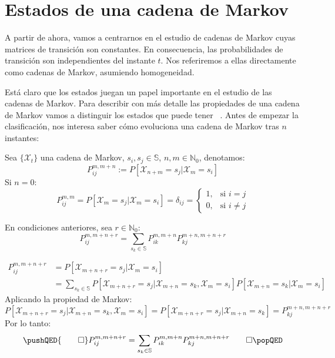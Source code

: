 \section{Estados de una cadena de Markov}
A partir de ahora, vamos a centrarnos en el estudio de cadenas de Markov cuyas matrices de transición son constantes. En consecuencia, las probabilidades de transición son independientes del instante $t$. Nos referiremos a ellas directamente como cadenas de Markov, asumiendo homogeneidad. 

Está claro que los estados juegan un papel importante en el estudio de las cadenas de Markov. Para describir con más detalle las propiedades de una cadena de Markov vamos a distinguir los estados que puede tener ~\cite{Barbosa}. Antes de empezar la clasificación, nos interesa saber cómo evoluciona una cadena de Markov tras $n$ instantes:


\begin{definition}
Sea $\{\mathcal{X}_t\}$ una cadena de Markov, $s_i, s_j \in \mathbb{S}$, $n,m\in\mathbb{N}_0$, denotamos:
\[P_{ij}^{m,m+n}:=P[\mathcal{X}_{n+m}=s_j|\mathcal{X}_m=s_i]\]
Si $n=0$:
\[P_{ij}^{m,m}=P[\mathcal{X}_{m}=s_j|\mathcal{X}_m=s_i]=\delta_{ij}=
\begin{cases}
    1, & \text{si } i=j\\
    0, &         \text{si } i\neq j
\end{cases}\]
\end{definition}
\begin{theorem}
En condiciones anteriores, sea $r\in \mathbb{N}_0$:
\[P_{ij}^{m,m+n+r}=\sum_{s_k\in\mathbb{S}}P_{ik}^{m,m+n}P_{kj}^{m+n,m+n+r}\]
\end{theorem}
\begin{proofs*}
    \[ 
    \begin{aligned}   
    P_{ij}^{m,m+n+r}&=P[\mathcal{X}_{m+n+r}=s_j|\mathcal{X}_m=s_i]\\
    &=\sum_{s_k\in\mathbb{S}} P[\mathcal{X}_{m+n+r}=s_j |\mathcal{X}_{m+n}=s_k,\mathcal{X}_m=s_i ] P[\mathcal{X}_{m+n}=s_k|\mathcal{X}_m=s_i ]
    \end{aligned} 
    \]
Aplicando la propiedad de Markov:
    \[P[\mathcal{X}_{m+n+r}=s_j |\mathcal{X}_{m+n}=s_k,\mathcal{X}_m=s_i ]=P[\mathcal{X}_{m+n+r}=s_j |\mathcal{X}_{m+n}=s_k]=P_{kj}^{m+n,m+n+r}\]
Por lo tanto:
    \[
    \pushQED{\qed}
    P_{ij}^{m,m+n+r}=\sum_{s_k\in\mathbb{S}}P_{ik}^{m,m+n}P_{kj}^{m+n,m+n+r}\qedhere
    \popQED\]
    
\end{proofs*}

